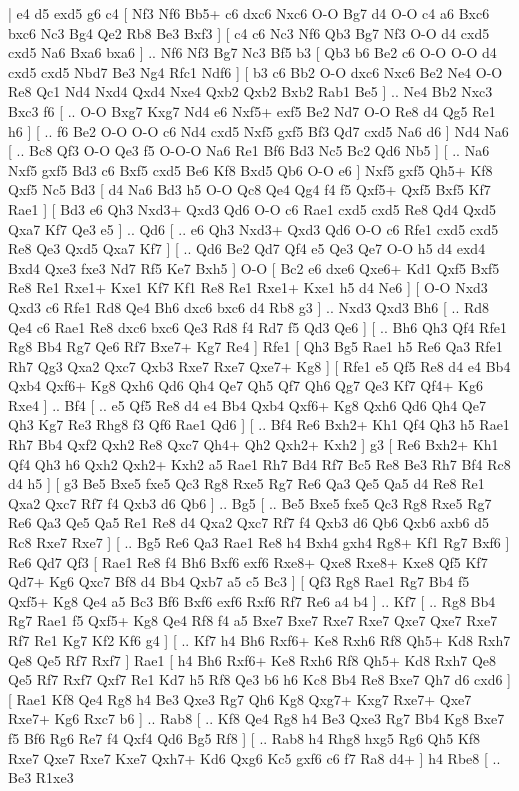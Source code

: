 \makegametitle 
|   e4   d5    exd5   g6    c4 [  Nf3 Nf6  Bb5+ c6  dxc6 Nxc6  O-O Bg7  d4 O-O  c4 a6  Bxc6 bxc6  Nc3 Bg4  Qe2 Rb8  Be3 Bxf3   ]  [  c4 c6  Nc3 Nf6  Qb3 Bg7  Nf3 O-O  d4 cxd5  cxd5 Na6  Bxa6 bxa6   ] .. Nf6    Nf3   Bg7    Nc3   Bf5    b3 [  Qb3 b6  Be2 c6  O-O O-O  d4 cxd5  cxd5 Nbd7  Be3 Ng4  Rfc1 Ndf6   ]  [  b3 c6  Bb2 O-O  dxc6 Nxc6  Be2 Ne4  O-O Re8  Qc1 Nd4  Nxd4 Qxd4  Nxe4 Qxb2  Qxb2 Bxb2  Rab1 Be5   ] .. Ne4    Bb2   Nxc3    Bxc3   f6 [ .. O-O  Bxg7 Kxg7  Nd4 e6  Nxf5+ exf5  Be2 Nd7  O-O Re8  d4 Qg5  Re1 h6   ]  [ .. f6  Be2 O-O  O-O c6  Nd4 cxd5  Nxf5 gxf5  Bf3 Qd7  cxd5 Na6  d6   ]  Nd4   Na6 [ .. Bc8  Qf3 O-O  Qe3 f5  O-O-O Na6  Re1 Bf6  Bd3 Nc5  Bc2 Qd6  Nb5   ]  [ .. Na6  Nxf5 gxf5  Bd3 c6  Bxf5 cxd5  Be6 Kf8  Bxd5 Qb6  O-O e6   ]  Nxf5   gxf5    Qh5+   Kf8    Qxf5   Nc5    Bd3 [  d4 Na6  Bd3 h5  O-O Qc8  Qe4 Qg4  f4 f5  Qxf5+ Qxf5  Bxf5 Kf7  Rae1   ]  [  Bd3 e6  Qh3 Nxd3+  Qxd3 Qd6  O-O c6  Rae1 cxd5  cxd5 Re8  Qd4 Qxd5  Qxa7 Kf7  Qe3 e5   ] .. Qd6 [ .. e6  Qh3 Nxd3+  Qxd3 Qd6  O-O c6  Rfe1 cxd5  cxd5 Re8  Qe3 Qxd5  Qxa7 Kf7   ]  [ .. Qd6  Be2 Qd7  Qf4 e5  Qe3 Qe7  O-O h5  d4 exd4  Bxd4 Qxe3  fxe3 Nd7  Rf5 Ke7  Bxh5   ]  O-O [  Bc2 e6  dxe6 Qxe6+  Kd1 Qxf5  Bxf5 Re8  Re1 Rxe1+  Kxe1 Kf7  Kf1 Re8  Re1 Rxe1+  Kxe1 h5  d4 Ne6   ]  [  O-O Nxd3  Qxd3 c6  Rfe1 Rd8  Qe4 Bh6  dxc6 bxc6  d4 Rb8  g3   ] .. Nxd3    Qxd3   Bh6 [ .. Rd8  Qe4 c6  Rae1 Re8  dxc6 bxc6  Qe3 Rd8  f4 Rd7  f5 Qd3  Qe6   ]  [ .. Bh6  Qh3 Qf4  Rfe1 Rg8  Bb4 Rg7  Qe6 Rf7  Bxe7+ Kg7  Re4   ]  Rfe1 [  Qh3 Bg5  Rae1 h5  Re6 Qa3  Rfe1 Rh7  Qg3 Qxa2  Qxc7 Qxb3  Rxe7 Rxe7  Qxe7+ Kg8   ]  [  Rfe1 e5  Qf5 Re8  d4 e4  Bb4 Qxb4  Qxf6+ Kg8  Qxh6 Qd6  Qh4 Qe7  Qh5 Qf7  Qh6 Qg7  Qe3 Kf7  Qf4+ Kg6  Rxe4   ] .. Bf4 [ .. e5  Qf5 Re8  d4 e4  Bb4 Qxb4  Qxf6+ Kg8  Qxh6 Qd6  Qh4 Qe7  Qh3 Kg7  Re3 Rhg8  f3 Qf6  Rae1 Qd6   ]  [ .. Bf4  Re6 Bxh2+  Kh1 Qf4  Qh3 h5  Rae1 Rh7  Bb4 Qxf2  Qxh2 Re8  Qxc7 Qh4+  Qh2 Qxh2+  Kxh2   ]  g3 [  Re6 Bxh2+  Kh1 Qf4  Qh3 h6  Qxh2 Qxh2+  Kxh2 a5  Rae1 Rh7  Bd4 Rf7  Bc5 Re8  Be3 Rh7  Bf4 Rc8  d4 h5   ]  [  g3 Be5  Bxe5 fxe5  Qc3 Rg8  Rxe5 Rg7  Re6 Qa3  Qe5 Qa5  d4 Re8  Re1 Qxa2  Qxc7 Rf7  f4 Qxb3  d6 Qb6   ] .. Bg5 [ .. Be5  Bxe5 fxe5  Qc3 Rg8  Rxe5 Rg7  Re6 Qa3  Qe5 Qa5  Re1 Re8  d4 Qxa2  Qxc7 Rf7  f4 Qxb3  d6 Qb6  Qxb6 axb6  d5 Rc8  Rxe7 Rxe7   ]  [ .. Bg5  Re6 Qa3  Rae1 Re8  h4 Bxh4  gxh4 Rg8+  Kf1 Rg7  Bxf6   ]  Re6   Qd7    Qf3 [  Rae1 Re8  f4 Bh6  Bxf6 exf6  Rxe8+ Qxe8  Rxe8+ Kxe8  Qf5 Kf7  Qd7+ Kg6  Qxc7 Bf8  d4 Bb4  Qxb7 a5  c5 Bc3   ]  [  Qf3 Rg8  Rae1 Rg7  Bb4 f5  Qxf5+ Kg8  Qe4 a5  Bc3 Bf6  Bxf6 exf6  Rxf6 Rf7  Re6 a4  b4   ] .. Kf7 [ .. Rg8  Bb4 Rg7  Rae1 f5  Qxf5+ Kg8  Qe4 Rf8  f4 a5  Bxe7 Bxe7  Rxe7 Rxe7  Qxe7 Qxe7  Rxe7 Rf7  Re1 Kg7  Kf2 Kf6  g4   ]  [ .. Kf7  h4 Bh6  Rxf6+ Ke8  Rxh6 Rf8  Qh5+ Kd8  Rxh7 Qe8  Qe5 Rf7  Rxf7   ]  Rae1 [  h4 Bh6  Rxf6+ Ke8  Rxh6 Rf8  Qh5+ Kd8  Rxh7 Qe8  Qe5 Rf7  Rxf7 Qxf7  Re1 Kd7  h5 Rf8  Qe3 b6  h6 Kc8  Bb4 Re8  Bxe7 Qh7  d6 cxd6   ]  [  Rae1 Kf8  Qe4 Rg8  h4 Be3  Qxe3 Rg7  Qh6 Kg8  Qxg7+ Kxg7  Rxe7+ Qxe7  Rxe7+ Kg6  Rxc7 b6   ] .. Rab8 [ .. Kf8  Qe4 Rg8  h4 Be3  Qxe3 Rg7  Bb4 Kg8  Bxe7 f5  Bf6 Rg6  Re7 f4  Qxf4 Qd6  Bg5 Rf8   ]  [ .. Rab8  h4 Rhg8  hxg5 Rg6  Qh5 Kf8  Rxe7 Qxe7  Rxe7 Kxe7  Qxh7+ Kd6  Qxg6 Kc5  gxf6 c6  f7 Ra8  d4+   ]  h4   Rbe8 [ .. Be3  R1xe3 